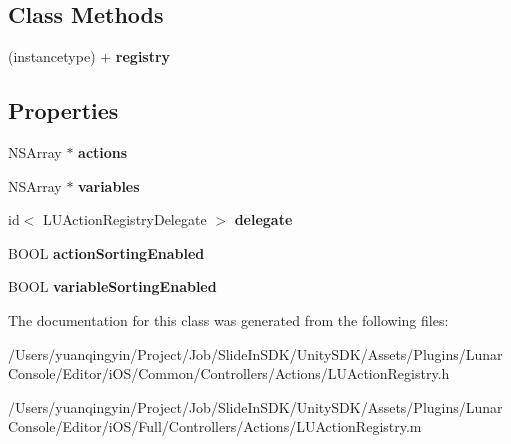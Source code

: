\subsection*{Class Methods}
\begin{DoxyCompactItemize}
\item 
\mbox{\label{interface_l_u_action_registry_aeb8cf4c6306e893e75781a4408b140c2}} 
(instancetype) + {\bfseries registry}
\end{DoxyCompactItemize}
\subsection*{Properties}
\begin{DoxyCompactItemize}
\item 
\mbox{\label{interface_l_u_action_registry_a0ddd11dd41012d65eb8de3f38ca509e2}} 
N\+S\+Array $\ast$ {\bfseries actions}
\item 
\mbox{\label{interface_l_u_action_registry_a2df85f38a11c71a84b2bc8282eec45a5}} 
N\+S\+Array $\ast$ {\bfseries variables}
\item 
\mbox{\label{interface_l_u_action_registry_a38f7bcfde783281a62d840642daa0121}} 
id$<$ L\+U\+Action\+Registry\+Delegate $>$ {\bfseries delegate}
\item 
\mbox{\label{interface_l_u_action_registry_ab4e65345dece885b7481b5f8018fb431}} 
B\+O\+OL {\bfseries action\+Sorting\+Enabled}
\item 
\mbox{\label{interface_l_u_action_registry_a5778befab28bd9b8acc6c9b3f45572bd}} 
B\+O\+OL {\bfseries variable\+Sorting\+Enabled}
\end{DoxyCompactItemize}


The documentation for this class was generated from the following files\+:\begin{DoxyCompactItemize}
\item 
/\+Users/yuanqingyin/\+Project/\+Job/\+Slide\+In\+S\+D\+K/\+Unity\+S\+D\+K/\+Assets/\+Plugins/\+Lunar\+Console/\+Editor/i\+O\+S/\+Common/\+Controllers/\+Actions/L\+U\+Action\+Registry.\+h\item 
/\+Users/yuanqingyin/\+Project/\+Job/\+Slide\+In\+S\+D\+K/\+Unity\+S\+D\+K/\+Assets/\+Plugins/\+Lunar\+Console/\+Editor/i\+O\+S/\+Full/\+Controllers/\+Actions/L\+U\+Action\+Registry.\+m\end{DoxyCompactItemize}
